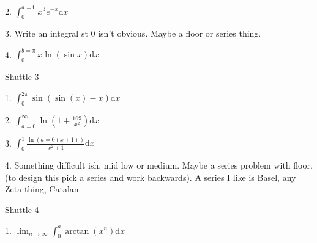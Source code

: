\documentclass{article}
\newcommand{\dd}{\mathrm{d}}
\begin{document}
2. $\int_0^{a=0} x^3e^{-x} \dd x$ \newline  \newline \newline 

3. Write an integral st 0 isn't obvious. Maybe a floor or series thing.

4. $\int_0^{b=\pi} x\ln(\sin{x}) \dd x$ \newline  \newline \newline 


Shuttle 3

1. $\int_0^{2 \pi} \sin(\sin(x)-x) \dd x$ \newline  \newline \newline  %

2. $\int_{a=0}^{\infty} \ln(1+\frac{169}{x^2}) \dd x$

3. $\int_0^{1} \frac{\ln(a=0(x+1))}{x^2+1} \dd x$ \newline  \newline \newline  %

4. Something difficult ish, mid low or medium. Maybe a series problem with floor. (to design this pick a series and work backwards). A series I like is Basel, any Zeta thing, Catalan.

Shuttle 4

1. $\lim_{n \to \infty} \int_0^{a} \arctan(x^n) \dd x$
\end{document}
